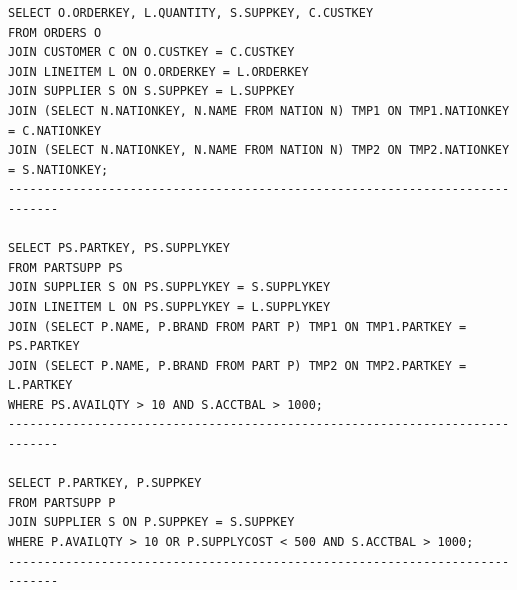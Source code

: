 \documentclass[12pt]{article}
\begin{document}
\begin{verbatim}
SELECT O.ORDERKEY, L.QUANTITY, S.SUPPKEY, C.CUSTKEY
FROM ORDERS O 
JOIN CUSTOMER C ON O.CUSTKEY = C.CUSTKEY
JOIN LINEITEM L ON O.ORDERKEY = L.ORDERKEY
JOIN SUPPLIER S ON S.SUPPKEY = L.SUPPKEY
JOIN (SELECT N.NATIONKEY, N.NAME FROM NATION N) TMP1 ON TMP1.NATIONKEY = C.NATIONKEY
JOIN (SELECT N.NATIONKEY, N.NAME FROM NATION N) TMP2 ON TMP2.NATIONKEY = S.NATIONKEY;
-----------------------------------------------------------------------------

SELECT PS.PARTKEY, PS.SUPPLYKEY
FROM PARTSUPP PS 
JOIN SUPPLIER S ON PS.SUPPLYKEY = S.SUPPLYKEY
JOIN LINEITEM L ON PS.SUPPLYKEY = L.SUPPLYKEY
JOIN (SELECT P.NAME, P.BRAND FROM PART P) TMP1 ON TMP1.PARTKEY = PS.PARTKEY
JOIN (SELECT P.NAME, P.BRAND FROM PART P) TMP2 ON TMP2.PARTKEY = L.PARTKEY
WHERE PS.AVAILQTY > 10 AND S.ACCTBAL > 1000;
-----------------------------------------------------------------------------

SELECT P.PARTKEY, P.SUPPKEY
FROM PARTSUPP P
JOIN SUPPLIER S ON P.SUPPKEY = S.SUPPKEY
WHERE P.AVAILQTY > 10 OR P.SUPPLYCOST < 500 AND S.ACCTBAL > 1000;
-----------------------------------------------------------------------------
\end{verbatim}
\end{document}
